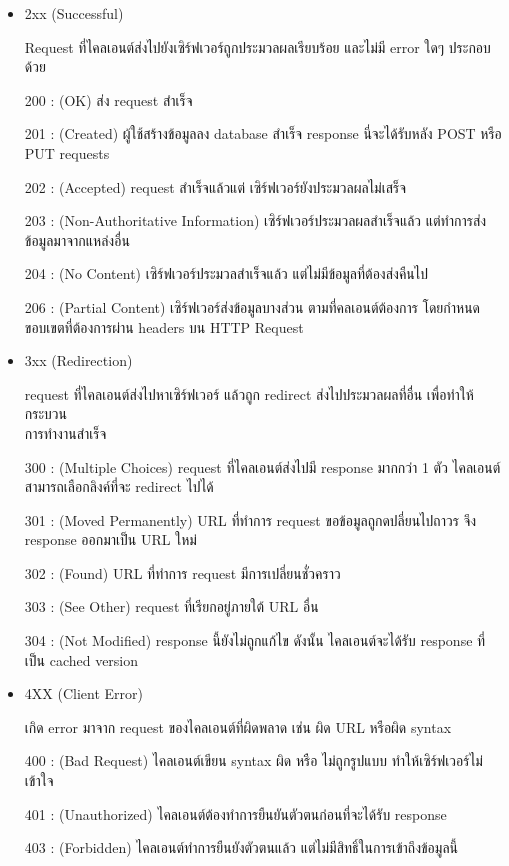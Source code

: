 \begin{itemize}
  \item 2xx (Successful) 
  
  Request ที่ไคลเอนต์ส่งไปยังเซิร์ฟเวอร์ถูกประมวลผลเรียบร้อย และไม่มี error ใดๆ ประกอบด้วย

  200 : (OK) ส่ง request สำเร็จ

  201 : (Created) ผู้ใช้สร้างข้อมูลลง database สำเร็จ response นี่จะได้รับหลัง POST หรือ PUT requests

  202 : (Accepted) request สำเร็จแล้วแต่ เซิร์ฟเวอร์ยังประมวลผลไม่เสร็จ
  
  203 : (Non-Authoritative Information) เซิร์ฟเวอร์ประมวลผลสำเร็จแล้ว แต่ทำการส่งข้อมูลมาจากแหล่งอื่น

  204 : (No Content) เซิร์ฟเวอร์ประมวลสำเร็จแล้ว แต่ไม่มีข้อมูลที่ต้องส่งคืนไป

  206 : (Partial Content) เซิร์ฟเวอร์ส่งข้อมูลบางส่วน ตามที่คลเอนต์ต้องการ โดยกำหนดขอบเขตที่ต้องการผ่าน headers บน HTTP Request

  \item 3xx (Redirection)
  
  request ที่ไคลเอนต์ส่งไปหาเซิร์ฟเวอร์ แล้วถูก redirect ส่งไปประมวลผลที่อื่น เพื่อทำให้กระบวน \\ การทำงานสำเร็จ

  300 : (Multiple Choices) request ที่ไคลเอนต์ส่งไปมี response มากกว่า 1 ตัว ไคลเอนต์สามารถเลือกลิงค์ที่จะ redirect ไปได้

  301 : (Moved Permanently) URL ที่ทำการ request ขอข้อมูลถูกดปลี่ยนไปถาวร จึง response ออกมาเป็น URL ใหม่

  302 : (Found) URL ที่ทำการ request มีการเปลี่ยนชั่วคราว

  303 : (See Other) request ที่เรียกอยู่ภายใต้ URL อื่น

  304 : (Not Modified) response นี้ยังไม่ถูกแก้ไข ดังนั้น ไคลเอนต์จะได้รับ response ที่เป็น cached version

  \item 4XX (Client Error)
  
  เกิด error มาจาก request ของไคลเอนต์ที่ผิดพลาด เช่น ผิด URL หรือผิด syntax

  400 : (Bad Request) ไคลเอนต์เขียน syntax ผิด หรือ ไม่ถูกรูปแบบ ทำให้เซิร์ฟเวอร์ไม่เข้าใจ

  401 : (Unauthorized) ไคลเอนต์ต้องทำการยืนยันตัวตนก่อนที่จะได้รับ response

  403 : (Forbidden) ไคลเอนต์ทำการยืนยังตัวตนแล้ว แต่ไม่มีสิทธิ์ในการเข้าถึงข้อมูลนี้


\end{itemize}
